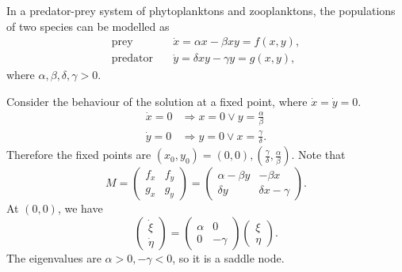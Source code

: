 \documentclass[10pt]{article}
\begin{document}
    \begin{example}
        In a predator-prey system of phytoplanktons and zooplanktons, the populations of two species can be modelled as
        \begin{align*}
            \text{prey}\quad & \dot{x}=\alpha x- \beta xy=f(x,y),\\
            \text{predator}\quad & \dot{y} = \delta xy-\gamma y=g(x,y),
        \end{align*}
        where $ \alpha,\beta,\delta,\gamma>0 $.

        Consider the behaviour of the solution at a fixed point, where $ \dot{x}=\dot{y}=0 $.
        \begin{align*}
            \dot{x}=0 &\Longrightarrow x = 0 \lor y = \frac{\alpha}{\beta}\\
            \dot{y}=0& \Longrightarrow y = 0 \lor x = \frac{\gamma}{\delta}.
        \end{align*}
        Therefore the fixed points are $ (x_0,y_0)=(0,0), (\frac{\gamma}{\delta},\frac{\alpha}{\beta}) $. Note that 
        \[
            M=\begin{pmatrix}
                f_x&f_y\\
                g_x&g_y
            \end{pmatrix}=\begin{pmatrix}
                \alpha-\beta y&-\beta x\\
                \delta y&\delta x-\gamma
            \end{pmatrix}.
        \]
        At $(0,0)$, we have 
        \[
            \begin{pmatrix}
                \dot{\xi}\\\dot{\eta}
            \end{pmatrix} = \begin{pmatrix}
                \alpha&0\\
                0&-\gamma
            \end{pmatrix}\begin{pmatrix}
                \xi\\\eta
            \end{pmatrix}.
        \]
        The eigenvalues are $ \alpha>0,-\gamma<0 $, so it is a saddle node.


\end{example}
\end{document}
